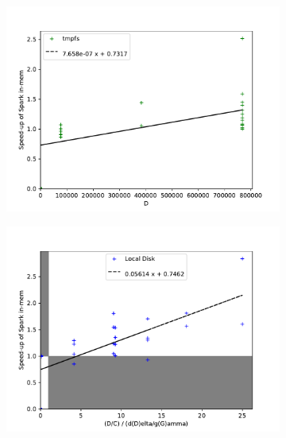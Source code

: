 \documentclass{IEEEtran}
\begin{document}
\begin{figure}
\begin{subfigure}{0.33\linewidth}
\centering
    \includegraphics[width=\textwidth]{results/figures/tmpfs-incrementation.pdf}
\caption{}
\label{fig:sub1}
\end{subfigure}%
    \begin{subfigure}{0.33\linewidth}
\centering
    \includegraphics[width=\textwidth]{results/figures/local-incrementation.pdf}
\caption{}
\label{fig:sub2}
    \end{subfigure}%
\begin{subfigure}{0.33\linewidth}
\centering

\end{subfigure}
\end{figure}
\end{document}
